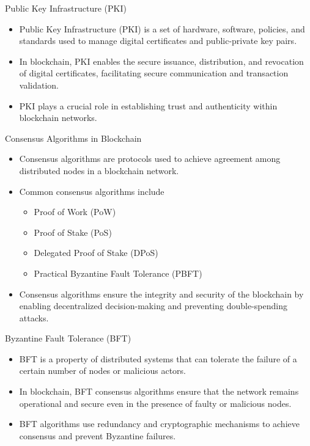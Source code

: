 \begin{frame}[fragile]{Public Key Infrastructure (PKI)}
    \begin{itemize}
        \item Public Key Infrastructure (PKI) is a set of hardware, software, policies, and standards used to manage digital certificates and public-private key pairs.
        \item In blockchain, PKI enables the secure issuance, distribution, and revocation of digital certificates, facilitating secure communication and transaction validation.
        \item PKI plays a crucial role in establishing trust and authenticity within blockchain networks.
    \end{itemize}
    
\end{frame}

\begin{frame}{Consensus Algorithms in Blockchain}
    \begin{itemize}
        \item Consensus algorithms are protocols used to achieve agreement among distributed nodes in a blockchain network.
        \item Common consensus algorithms include
        \begin{itemize}
            \item Proof of Work (PoW)
            \item Proof of Stake (PoS)
            \item Delegated Proof of Stake (DPoS)
            \item Practical Byzantine Fault Tolerance (PBFT)
        \end{itemize}
        \item Consensus algorithms ensure the integrity and security of the blockchain by enabling decentralized decision-making and preventing double-spending attacks.
    \end{itemize}
\end{frame}

\begin{frame}{Byzantine Fault Tolerance (BFT)}
    \begin{itemize}
        \item BFT is a property of distributed systems that can tolerate the failure of a certain number of nodes or malicious actors.
        \item In blockchain, BFT consensus algorithms ensure that the network remains operational and secure even in the presence of faulty or malicious nodes.
        \item BFT algorithms use redundancy and cryptographic mechanisms to achieve consensus and prevent Byzantine failures.
    \end{itemize}
\end{frame}

